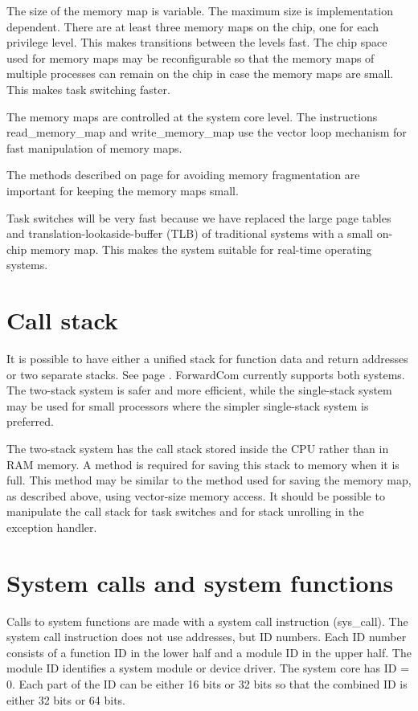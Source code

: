 \documentclass[forwardcom.tex]{subfiles}
\begin{document}
The size of the memory map is variable. The maximum size is implementation dependent. There are at least three memory maps on the chip, one for each privilege level. This makes transitions between the levels fast. The chip space used for memory maps may be reconfigurable so that the memory maps of multiple processes can remain on the chip in case the memory maps are small. This makes task switching faster.
\vspace{2mm}

The memory maps are controlled at the system core level. The instructions read\_memory\_map and write\_memory\_map use the vector loop mechanism for fast manipulation of memory maps.
\vspace{2mm}

The methods described on page \pageref{memoryManagement} for avoiding memory fragmentation are important for keeping the memory maps small. 
\vspace{2mm}

Task switches will be very fast because we have replaced the large page tables and translation-lookaside-buffer (TLB) of traditional systems with a small on-chip memory map. This makes the system suitable for real-time operating systems.

\section{Call stack}
It is possible to have either a unified stack for function data and return addresses or two separate stacks. See page \pageref{callStackAlternatives}. ForwardCom currently supports both systems. The two-stack system is safer and more efficient, while the single-stack system may be used for small processors where the simpler single-stack system is preferred.
\vspace{2mm}

The two-stack system has the call stack stored inside the CPU rather than in RAM memory. A method is required for saving this stack to memory when it is full. This method may be similar to the method used for saving the memory map, as described above, using vector-size memory access. It should be possible to manipulate the call stack for task switches and for stack unrolling in the exception handler.

\section{System calls and system functions} \label{systemCallIDSystem}
Calls to system functions are made with a system call instruction (sys\_call). The system call instruction does not use addresses, but ID numbers. Each ID number consists of a function ID in the lower half and a module ID in the upper half. The module ID identifies a system module or device driver. The system core has ID = 0. Each part of the ID can be either 16 bits or 32 bits so that the combined ID is either 32 bits or 64 bits. 
\vspace{2mm}
\end{document}

